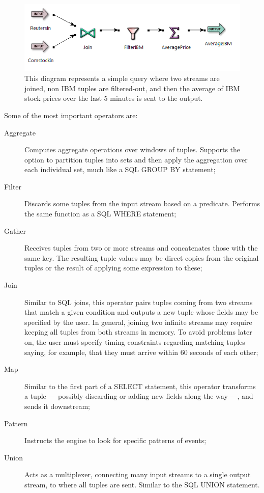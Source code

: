 \documentclass[a4,11pt]{report}
\begin{document}
\begin{figure}[htbp]
  \centering
  \includegraphics[width=\textwidth]{eventflow.png}
  \caption{This diagram represents a simple query where two streams
    are joined, non IBM tuples are filtered-out, and then the average
    of IBM stock prices over the last 5 minutes is sent to the
    output.}
  \label{fig:eventflow-sample}
\end{figure}

Some of the most important operators are:

\begin{description}
\item [Aggregate] Computes aggregate operations over windows of
  tuples. Supports the option to partition tuples into sets and then
  apply the aggregation over each individual set, much like a SQL
  GROUP BY statement;
\item [Filter] Discards some tuples from the input stream based on a
  predicate. Performs the same function as a SQL WHERE statement;
\item [Gather] Receives tuples from two or more streams and
  concatenates those with the same key. The resulting tuple values may
  be direct copies from the original tuples or the result of applying
  some expression to these;
\item [Join] Similar to SQL joins, this operator pairs tuples coming
  from two streams that match a given condition and outputs a new
  tuple whose fields may be specified by the user. In general, joining
  two infinite streams may require keeping all tuples from both
  streams in memory. To avoid problems later on, the user must specify
  timing constraints regarding matching tuples saying, for example,
  that they must arrive within 60 seconds of each other;
\item [Map] Similar to the first part of a SELECT statement, this
  operator transforms a tuple --- possibly discarding or adding new
  fields along the way ---, and sends it downstream;
\item [Pattern] Instructs the engine to look for specific patterns of
  events;
\item [Union] Acts as a multiplexer, connecting many input streams to
  a single output stream, to where all tuples are sent. Similar to the
  SQL UNION statement.
\end{description}
\end{document}
